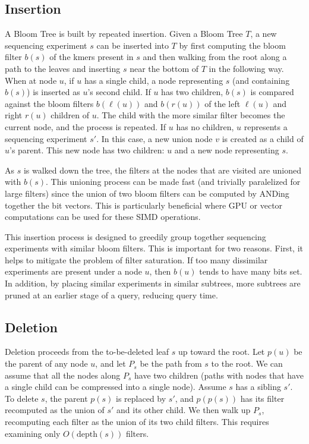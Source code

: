 \documentclass[11pt]{article}
\begin{document}
\subsection{Insertion}


A Bloom Tree is built by repeated insertion. Given a Bloom Tree $T$, a new sequencing experiment $s$ can be inserted into $T$ by first computing the bloom filter $b(s)$ of the kmers present in $s$ and then walking from the root along a path to the leaves and inserting $s$ near the bottom of $T$ in the following way. When at node $u$, if $u$ has a single child, a node representing $s$ (and containing $b(s)$) is inserted as $u$'s second child. If  $u$ has two children, $b(s)$ is compared against the bloom filters $b(\ell(u))$ and $b(r(u))$ of the left $\ell(u)$ and right $r(u)$ children of $u$. The child with the more similar filter becomes the current node, and the process is repeated.  If $u$ has no children, $u$ represents a sequencing experiment $s'$. In this case, a new union node $v$ is created as a child of $u$'s parent. This new node has two children: $u$ and a new node representing $s$. 

As $s$ is walked down the tree, the filters at the nodes that are visited are unioned with $b(s)$. This unioning process can be made fast (and trivially paralelized for large filters) since the union of two bloom filters can be computed by ANDing together the bit vectors. This is particularly beneficial where GPU or vector computations can be used for these SIMD operations. 

This insertion process is designed to greedily group together sequencing experiments with similar bloom filters. This is important for two reasons. First, it helps to mitigate the problem of filter saturation. If too many dissimilar experiments are present under a node $u$, then $b(u)$ tends to have many bits set. In addition, by placing similar experiments in similar subtrees, more subtrees are pruned at an earlier stage of a query, reducing query time.

\subsection{Deletion}

Deletion proceeds from the to-be-deleted leaf $s$ up toward the root. Let $p(u)$ be the parent of any node $u$, and let $P_s$ be the path from $s$ to the root. We can assume that all the nodes along $P_s$ have two children (paths with nodes that have a single child can be compressed into a single node).  Assume  $s$ has a sibling $s'$. To delete $s$, the parent $p(s)$ is replaced by $s'$, and $p(p(s))$ has its filter recomputed as the union of $s'$ and its other child. We then walk up $P_s$, recomputing each filter as the union of its two child filters. This requires examining only $O(\text{depth}(s))$ filters. 
\end{document}
